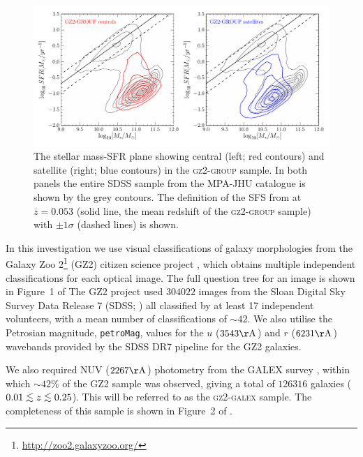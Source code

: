\documentclass[useAMS,usenatbib]{mn2e}
\def\lesssim{\mathrel{\hbox{\rlap{\hbox{\lower3pt\hbox{$\sim$}}}\hbox{\raise2pt\hbox{$<$}}}}}
\begin{document}
\begin{figure}
\centering
\includegraphics[width=\textwidth]{sfr_mass_quenched_centrals_satellites_gz2_group.pdf}
\caption[Stellar mass-SFR plane for the centrals and satellites of the \textsc{gz2-group} sample]{The stellar mass-SFR plane showing central (left; red contours) and satellite (right; blue contours) in the \textsc{gz2-group} sample. In both panels the entire SDSS sample from the MPA-JHU catalogue is shown by the grey contours. The definition of the SFS from \cite{peng10} at $\overline{z} = 0.053$ (solid line, the mean redshift of the \textsc{gz2-group} sample) with $\pm1\sigma$ (dashed lines) is shown.}
\label{fig:sfrmass}
\end{figure}


In this investigation we use visual classifications of galaxy morphologies from the Galaxy Zoo 2\footnote{\url{http://zoo2.galaxyzoo.org/}} (GZ2) citizen science project \citep{lintott09, GZ2}, which obtains multiple independent classifications for each optical image. The full question tree for an image is shown in Figure~1 of \citeauthor{GZ2}  The GZ2 project used $304022$ images from the Sloan Digital Sky Survey Data Release 7 (SDSS; \citealt{york00, abazajian09}) all classified by at least 17 independent volunteers, with a mean number of classifications of $\sim42$. We also utilise the Petrosian magnitude, {\tt petroMag}, values for the $u$ ($3543 \rm{\AA}$) and $r$ ($6231 \rm{\AA}$) wavebands provided by the SDSS DR7 pipeline for the GZ2 galaxies.

We also required NUV ($2267 \rm{\AA}$) photometry from the GALEX survey \citep{martin05}, within which $\sim42\%$ of the GZ2 sample was observed, giving a total of $126316$ galaxies ($0.01 \lesssim z \lesssim 0.25$). This will be referred to as the \textsc{gz2-galex} sample. The completeness of this sample is shown in Figure~2 of \cite{smethurst15}. 
\end{document}
